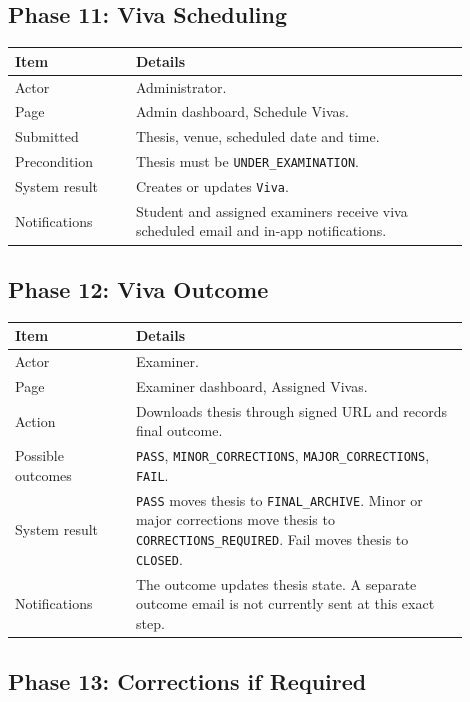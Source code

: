 \documentclass[11pt,a4paper]{article}
\newcommand{\status}[1]{\texttt{#1}}
\newcommand{\code}[1]{\texttt{#1}}
\begin{document}
\subsection{Phase 11: Viva Scheduling}

\begin{longtable}{p{0.24\linewidth} p{0.66\linewidth}}
\toprule
\textbf{Item} & \textbf{Details} \\
\midrule
Actor & Administrator. \\
Page & Admin dashboard, Schedule Vivas. \\
Submitted & Thesis, venue, scheduled date and time. \\
Precondition & Thesis must be \status{UNDER\_EXAMINATION}. \\
System result & Creates or updates \code{Viva}. \\
Notifications & Student and assigned examiners receive viva scheduled email and in-app notifications. \\
\bottomrule
\end{longtable}

\newpage

\subsection{Phase 12: Viva Outcome}

\begin{longtable}{p{0.24\linewidth} p{0.66\linewidth}}
\toprule
\textbf{Item} & \textbf{Details} \\
\midrule
Actor & Examiner. \\
Page & Examiner dashboard, Assigned Vivas. \\
Action & Downloads thesis through signed URL and records final outcome. \\
Possible outcomes & \status{PASS}, \status{MINOR\_CORRECTIONS}, \status{MAJOR\_CORRECTIONS}, \status{FAIL}. \\
System result & \status{PASS} moves thesis to \status{FINAL\_ARCHIVE}. Minor or major corrections move thesis to \status{CORRECTIONS\_REQUIRED}. Fail moves thesis to \status{CLOSED}. \\
Notifications & The outcome updates thesis state. A separate outcome email is not currently sent at this exact step. \\
\bottomrule
\end{longtable}

\subsection{Phase 13: Corrections if Required}
\end{document}

